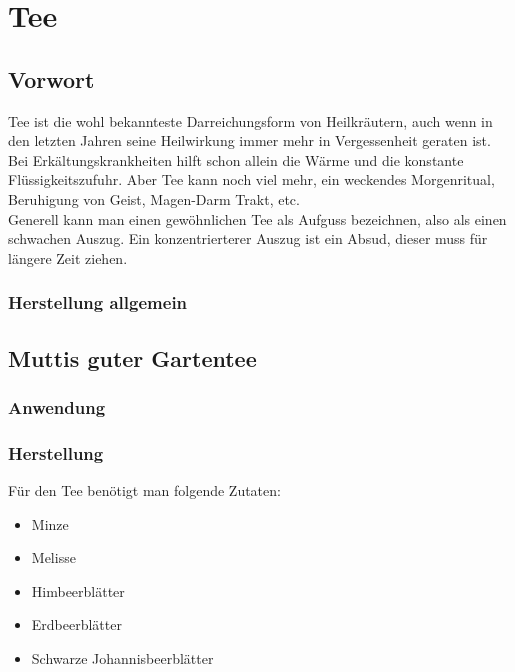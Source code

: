 \chapter{Tee}

\section{Vorwort}

Tee ist die wohl bekannteste Darreichungsform von Heilkräutern, auch wenn in den letzten Jahren seine Heilwirkung immer mehr in Vergessenheit geraten ist. Bei Erkältungskrankheiten hilft schon allein die Wärme und die konstante Flüssigkeitszufuhr. Aber Tee kann noch viel mehr, ein weckendes Morgenritual, Beruhigung von Geist, Magen-Darm Trakt, etc.\\

Generell kann man einen gewöhnlichen Tee als Aufguss bezeichnen, also als einen schwachen Auszug. Ein konzentrierterer Auszug ist ein Absud, dieser muss für längere Zeit ziehen.\\



\newpage



\subsection{Herstellung allgemein}



\section{Muttis guter Gartentee}

\subsection{Anwendung}

\subsection{Herstellung}

Für den Tee benötigt man folgende Zutaten:

\begin{itemize}
	\item Minze
	\item Melisse
	\item Himbeerblätter
	\item Erdbeerblätter
	\item Schwarze Johannisbeerblätter
\end{itemize}


